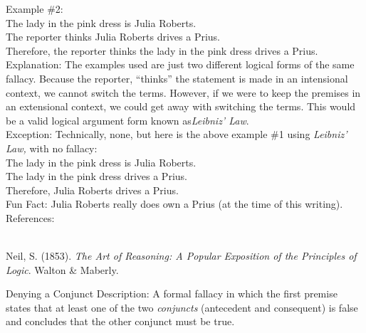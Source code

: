 \documentclass[a4paper,12pt,single,pdftex]{scrartcl}
\begin{document}
    
      Example \#2:
    \\

    
      The lady in the pink dress is Julia Roberts.
    \\

    
      The reporter thinks Julia Roberts drives a Prius.
    \\

    
      Therefore, the reporter thinks the lady in the pink dress drives a Prius.
    \\

    
      Explanation: The examples used are just two different logical forms of the same fallacy.  Because the reporter, “thinks” the statement is made in an intensional context, we cannot switch the terms.  However, if we were to keep the premises in an extensional context, we could get away with switching the terms.  This would be a valid logical argument form known as{\it  Leibniz’ Law}.
    \\

    
      Exception: Technically, none, but here is the above example \#1 using {\it Leibniz’ Law, }with no fallacy:
    \\

    
      The lady in the pink dress is Julia Roberts.
    \\

    
      The lady in the pink dress drives a Prius.
    \\

    
      Therefore, Julia Roberts drives a Prius.
    \\

    
      Fun Fact: Julia Roberts really does own a Prius (at the time of this writing).
    \\

    References:

    
      
        
      \\

      
        
          Neil, S. (1853). {\it The Art of Reasoning: A Popular Exposition of the Principles of Logic}. Walton \& Maberly.
        
      
    
  

Denying a Conjunct
    Description: A formal fallacy in which the first premise states that at least one of the two {\it conjuncts} (antecedent and consequent) is false and concludes that the other conjunct must be true.
\end{document}

